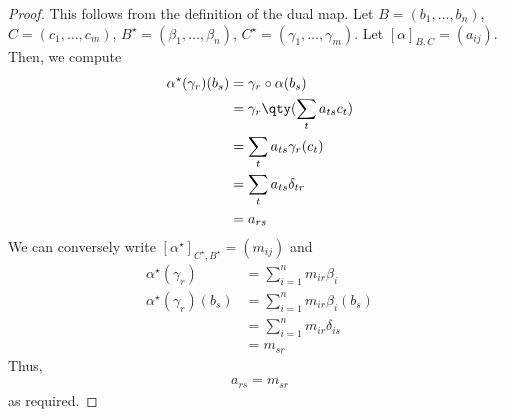 \begin{proof}
	This follows from the definition of the dual map.
	Let $B = (b_1, \dots, b_n)$, $C = (c_1, \dots, c_m)$, $B^\star = (\beta_1, \dots, \beta_n)$, $C^\star = (\gamma_1, \dots, \gamma_m)$.
	Let $[\alpha]_{B,C} = (a_{ij})$.
	Then, we compute
	\begin{align*}
		\alpha^\star(\gamma_r)(b_s) & = \gamma_r \circ \alpha(b_s)         \\
		                            & = \gamma_r \qty( \sum_t a_{ts} c_t ) \\
		                            & = \sum_t a_{ts} \gamma_r(c_t)        \\
		                            & = \sum_t a_{ts} \delta_{tr}          \\
		                            & = a_{rs}
	\end{align*}
	We can conversely write $[\alpha^\star]_{C^\star, B^\star} = (m_{ij})$ and
	\begin{align*}
		\alpha^\star(\gamma_r)      & = \sum_{i=1}^n m_{ir} \beta_i      \\
		\alpha^\star(\gamma_r)(b_s) & = \sum_{i=1}^n m_{ir} \beta_i(b_s) \\
		                            & = \sum_{i=1}^n m_{ir} \delta_{is}  \\
		                            & = m_{sr}
	\end{align*}
	Thus,
	\begin{align*}
		a_{rs} = m_{sr}
	\end{align*}
	as required.
\end{proof}

